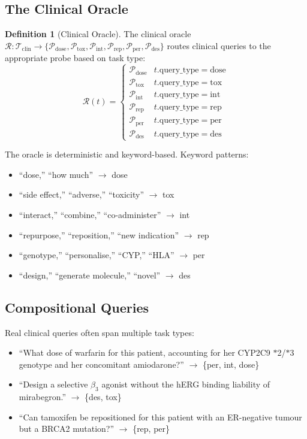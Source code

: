 \documentclass[11pt,twocolumn,a4paper]{article}
\theoremstyle{definition}
\newtheorem{definition}[theorem]{Definition}
\theoremstyle{remark}
\newcommand{\taskspace}{\mathcal{T}}
\newcommand{\probe}{\mathcal{P}}
\newcommand{\oracle}{\mathcal{R}}
\begin{document}
\subsection{The Clinical Oracle}

\begin{definition}[Clinical Oracle]
\label{def:clinical_oracle}
The clinical oracle $\oracle: \taskspace_{\mathrm{clin}} \to \{\probe_{\mathrm{dose}}, \probe_{\mathrm{tox}}, \probe_{\mathrm{int}}, \probe_{\mathrm{rep}}, \probe_{\mathrm{per}}, \probe_{\mathrm{des}}\}$ routes clinical queries to the appropriate probe based on task type:
\begin{equation}
\oracle(t) = \begin{cases}
\probe_{\mathrm{dose}} & t.\text{query\_type} = \mathrm{dose} \\
\probe_{\mathrm{tox}} & t.\text{query\_type} = \mathrm{tox} \\
\probe_{\mathrm{int}} & t.\text{query\_type} = \mathrm{int} \\
\probe_{\mathrm{rep}} & t.\text{query\_type} = \mathrm{rep} \\
\probe_{\mathrm{per}} & t.\text{query\_type} = \mathrm{per} \\
\probe_{\mathrm{des}} & t.\text{query\_type} = \mathrm{des}
\end{cases}
\end{equation}
\end{definition}

The oracle is deterministic and keyword-based. Keyword patterns:
\begin{itemize}[nosep,leftmargin=*]
\item ``dose,'' ``how much'' $\to$ dose
\item ``side effect,'' ``adverse,'' ``toxicity'' $\to$ tox
\item ``interact,'' ``combine,'' ``co-administer'' $\to$ int
\item ``repurpose,'' ``reposition,'' ``new indication'' $\to$ rep
\item ``genotype,'' ``personalise,'' ``CYP,'' ``HLA'' $\to$ per
\item ``design,'' ``generate molecule,'' ``novel'' $\to$ des
\end{itemize}

\subsection{Compositional Queries}

Real clinical queries often span multiple task types:
\begin{itemize}[nosep,leftmargin=*]
\item ``What dose of warfarin for this patient, accounting for her CYP2C9 $\ast$2/$\ast$3 genotype and her concomitant amiodarone?'' $\to$ \{per, int, dose\}
\item ``Design a selective $\beta_3$ agonist without the hERG binding liability of mirabegron.'' $\to$ \{des, tox\}
\item ``Can tamoxifen be repositioned for this patient with an ER-negative tumour but a BRCA2 mutation?'' $\to$ \{rep, per\}
\end{itemize}
\end{document}
